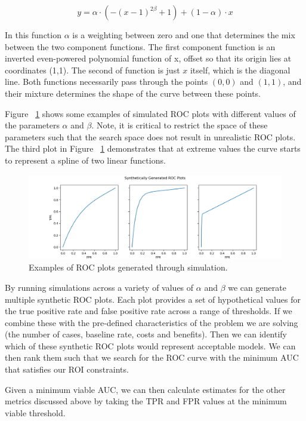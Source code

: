\documentclass[11pt,a4paper]{article}
\begin{document}
\begin{equation}
\label{auc:sim}
y = \alpha \cdot (-(x-1)^{2\beta}+1) + (1-\alpha) \cdot x
\end{equation}

In this function $\alpha$ is a weighting between zero and one that determines the
mix between the two component functions. The first component function is an
inverted even-powered polynomial function of x, offset so that its origin
lies at coordinates {(1,1)}.
The second of function is just $x$ itself, which is the diagonal line.
Both functions necessarily pass through
the points $(0,0)$ and $(1,1)$, and their mixture determines the shape of the
curve between these points.

Figure ~\ref{fig:ROC} shows some examples of simulated ROC plots with different values of
the parameters $\alpha$ and $\beta$. Note, it is critical to restrict the space of these parameters such
that the search space does not result in unrealistic ROC plots. The third plot in Figure ~\ref{fig:ROC}
demonstrates that at extreme values the curve starts to represent a spline of two linear functions.

\begin{figure}[h!]
\includegraphics[scale=0.5]{images/roc_plots.png}
\caption{Examples of ROC plots generated through simulation.}
\label{fig:ROC}
\end{figure}


By running simulations across a variety of values of $\alpha$ and $\beta$
we can generate multiple synthetic ROC plots. Each plot provides a set of hypothetical
values for the true positive rate and false positive rate across a range of thresholds.
If we combine these with the pre-defined characteristics of the problem we are solving
(the number of cases, baseline rate, costs and benefits). Then we can identify which
of these synthetic ROC plots would represent acceptable models. We can then rank
them such that we search for the ROC curve with the minimum AUC that satisfies our
ROI constraints.

Given a minimum viable AUC, we can then calculate estimates for the other metrics discussed
above by taking the TPR and FPR values at the minimum viable threshold.
\end{document}
